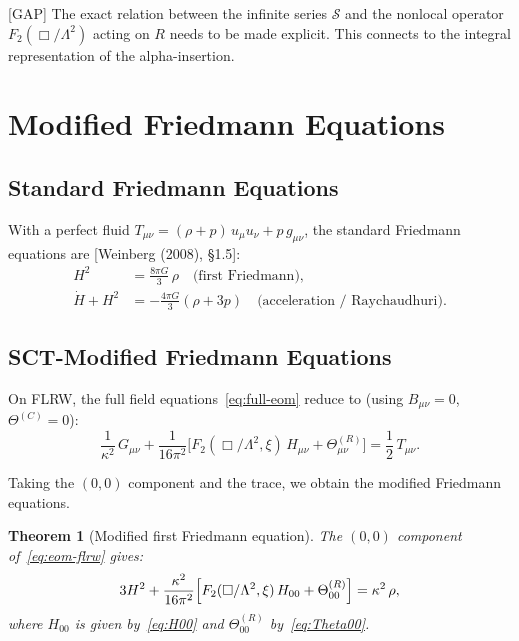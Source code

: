 \documentclass[12pt,a4paper]{article}
\newtheorem{theorem}[proposition]{Theorem}
\theoremstyle{definition}
\theoremstyle{remark}
\newcommand{\fromlit}[1]{\textcolor{blue!70!black}{\textsf{[#1]}}}
\newcommand{\gap}{\textcolor{red!80!black}{\textsf{[GAP]}}}
\begin{document}
\gap{} The exact relation between the infinite series $\mathcal{S}$
and the nonlocal operator $F_2(\Box/\Lambda^2)$ acting on $R$
needs to be made explicit. This connects to the integral
representation of the alpha-insertion.

\section{Modified Friedmann Equations}\label{sec:friedmann}

\subsection{Standard Friedmann Equations}

With a perfect fluid $T_{\mu\nu} = (\rho + p)\,u_\mu u_\nu
+ p\,g_{\mu\nu}$, the standard Friedmann equations are
\fromlit{Weinberg (2008), \S1.5}:
\begin{align}
  H^2 &= \frac{8\pi G}{3}\,\rho
  \quad \text{(first Friedmann)},
  \label{eq:fried1}\\
  \dot{H} + H^2 &= -\frac{4\pi G}{3}(\rho + 3p)
  \quad \text{(acceleration / Raychaudhuri)}.
  \label{eq:fried2}
\end{align}

\subsection{SCT-Modified Friedmann Equations}\label{sec:sct-friedmann}

On FLRW, the full field equations~\eqref{eq:full-eom} reduce to
(using $B_{\mu\nu} = 0$, $\Theta^{(C)} = 0$):
\begin{equation}\label{eq:eom-flrw}
  \frac{1}{\kappa^2}\,G_{\mu\nu}
  + \frac{1}{16\pi^2}\bigl[F_2(\Box/\Lambda^2,\xi)\,H_{\mu\nu}
  + \Theta^{(R)}_{\mu\nu}\bigr]
  = \frac{1}{2}\,T_{\mu\nu}.
\end{equation}

Taking the $(0,0)$ component and the trace, we obtain the modified
Friedmann equations.

\begin{theorem}[Modified first Friedmann equation]\label{thm:fried1-mod}
The $(0,0)$ component of~\eqref{eq:eom-flrw} gives:
\begin{equation}\label{eq:fried1-mod}
  3H^2 + \frac{\kappa^2}{16\pi^2}\Bigl[
  F_2(\Box/\Lambda^2,\xi)\,H_{00}
  + \Theta^{(R)}_{00}\Bigr]
  = \kappa^2\,\rho,
\end{equation}
where $H_{00}$ is given by~\eqref{eq:H00} and $\Theta^{(R)}_{00}$
by~\eqref{eq:Theta00}.
\end{theorem}
\end{document}
